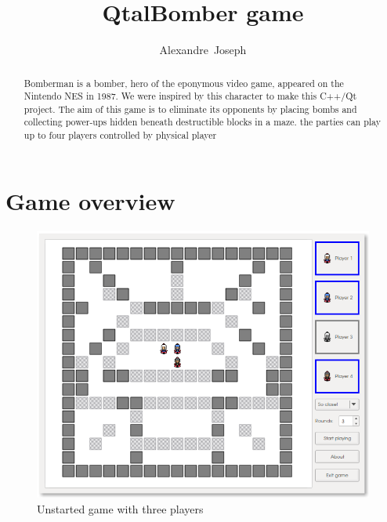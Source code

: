 \documentclass{article}
\begin{document}
\title{QtalBomber game}
\author{Alexandre~Joseph}

\maketitle

\begin{abstract}
Bomberman is a bomber, hero of the eponymous video game, appeared on the
Nintendo NES in 1987. We were inspired by this character to make this
C++/Qt project. The aim of this game is to eliminate its opponents
by placing bombs and collecting power-ups hidden beneath destructible
blocks in a maze. the parties can play up to four players controlled by
physical player 
\end{abstract}

\tableofcontents
\clearpage


\section{Game overview}

\begin{figure}[h!]
  \centering
    \includegraphics[width=\textwidth]{figures/qtalbomber.png}
  \caption{Unstarted game with three players}
\end{figure}
\end{document}
